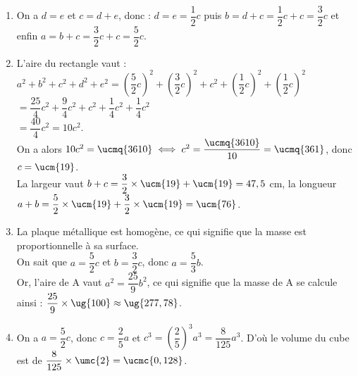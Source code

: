 \ \\ [-5mm]
\begin{enumerate}
   \item On a $d = e$  et $c = d+e$, donc : $d = e = \dfrac12c$ \; puis \; $b = d + c = \dfrac12c + c = \dfrac32c$ \; et enfin \; $a = b + c = \dfrac32c + c = \dfrac52c$. \\
   \smallskip
   \item L'aire du rectangle vaut : \\
   $a^2+b^2+c^2+d^2+e^2 =\left(\dfrac52c\right)^2+\left(\dfrac32c\right)^2+c^2+\left(\dfrac12c\right)^2+\left(\dfrac12c\right)^2$ \\ [1mm]
   \hspace*{3.05cm} $=\dfrac{25}{4}c^2+\dfrac94c^2+c^2+\dfrac14c^2+\dfrac14c^2$ \\ [1mm]
   \hspace*{3.05cm} $=\dfrac{40}{4}c^2=10c^2$. \\
   On a alors $10c^2 =\ucmq{3610} \iff c^2 =\dfrac{\ucmq{3610}}{10} =\ucmq{361}$, donc $c=\ucm{19}$. \\
   La largeur vaut $b+c =\dfrac32\times\ucm{19}+\ucm{19} = 47,5$ cm, la longueur $a+b =\dfrac52\times\ucm{19}+\dfrac32\times\ucm{19}= \ucm{76}$. \\ [1mm]
   \item La plaque métallique est homogène, ce qui signifie que la masse est proportionnelle à sa surface. \\
   On sait que $a=\dfrac52c$ et $b=\dfrac32c$, donc $a=\dfrac53b$. \\ [1mm]
   Or, l'aire de A vaut $a^2 =\dfrac{25}{9}b^2$, ce qui signifie que la masse de A se calcule ainsi : $\dfrac{25}{9}\times\ug{100} \approx\ug{277,78}$. \\ [1mm]
   \item On a $a =\dfrac52c$, donc $c=\dfrac25a$ et $c^3=\left(\dfrac25\right)^3a^3 =\dfrac{8}{125}a^3$. D'où le volume du cube est de $\dfrac{8}{125}\times\umc{2} =\ucmc{0,128}$. \\ [1mm]
\end{enumerate}
